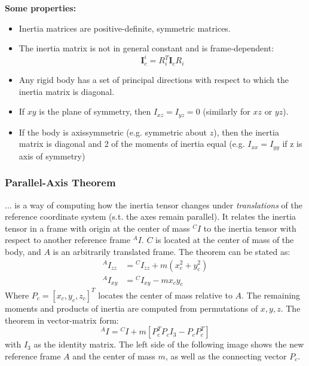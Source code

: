 \textbf{Some properties:}
\begin{itemize}
	\item Inertia matrices are positive-definite, symmetric matrices.
	\item The inertia matrix is not in general constant and is frame-dependent:
		\[ \mathbf{I}_{c}^{i} = R_{i}^T \mathbf{I}_{c} R_{i} \]
	\item Any rigid body has a set of principal directions with respect to which the inertia matrix is diagonal.
	\item If $xy$ is the plane of symmetry, then $ I_{xz} = I_{yz} = 0 $ (similarly for $xz$ or $yz$).
	\item If the body is axissymmetric (e.g. symmetric about $z$), then the inertia matrix is diagonal and 2 of the moments of inertia equal (e.g. $ I_{xx} = I_{yy} $ if z is axis of symmetry)
\end{itemize}

\subsubsection{Parallel-Axis Theorem}
... is a way of computing how the inertia tensor changes under \textit{translations} of the reference coordinate system (s.t. the axes remain parallel). It relates the inertia tensor in a frame with origin at the center of mass ${}^CI$ to the inertia tensor with respect to another reference frame ${}^AI$. $C$ is located at the center of mass of the body, and $A$ is an arbitrarily translated frame. The theorem can be stated as:
\begin{align*} \label{eq:pat}
	{}^{A} I_{zz} &= {}^{C} I_{zz} + m (x_{c}^2 + y_{c}^2) \\
	{}^{A} I_{xy} &= {}^{C} I_{xy} - m x_{c} y_{c} 
\end{align*}
Where $ P_{c} = [x_{c} , y_{c} , z_{c}]^T $ locates the center of mass relative to $A$. The remaining moments and products of inertia are computed from permutations of $ x,y,z $. The theorem in vector-matrix form:
\[ {}^{A} I = {}^{C} I + m [P_{c}^T P_{c} I_{3} - P_{c} P_{c}^T] \]
with $ I_{3} $ as the identity matrix. The left side of the following image shows the new reference frame $A$ and the center of mass $m$, as well as the connecting vector $P_{c}$.

